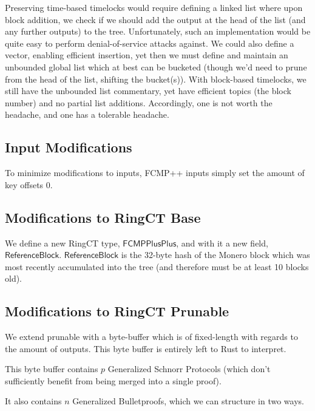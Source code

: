 \documentclass[]{article}
\begin{document}
Preserving time-based timelocks would require defining a linked list where upon block addition, we check if we should add the output at the head of the list (and any further outputs) to the tree. Unfortunately, such an implementation would be quite easy to perform denial-of-service attacks against. We could also define a vector, enabling efficient insertion, yet then we must define and maintain an unbounded global list which at best can be bucketed (though we'd need to prune from the head of the list, shifting the bucket(s)). With block-based timelocks, we still have the unbounded list commentary, yet have efficient topics (the block number) and no partial list additions. Accordingly, one is not worth the headache, and one has a tolerable headache.

\subsection{Input Modifications}

To minimize modifications to inputs, FCMP++ inputs simply set the amount of key offsets 0.

\subsection{Modifications to RingCT Base}

We define a new RingCT type, $\mathsf{FCMPPlusPlus}$, and with it a new field, $\mathsf{ReferenceBlock}$. $\mathsf{ReferenceBlock}$ is the 32-byte hash of the Monero block which was most recently accumulated into the tree (and therefore must be at least 10 blocks old).

\subsection{Modifications to RingCT Prunable}

We extend prunable with a byte-buffer which is of fixed-length with regards to the amount of outputs. This byte buffer is entirely left to Rust to interpret.

This byte buffer contains $p$ Generalized Schnorr Protocols (which don't sufficiently benefit from being merged into a single proof).

It also contains $n$ Generalized Bulletproofs, which we can structure in two ways.
\end{document}
